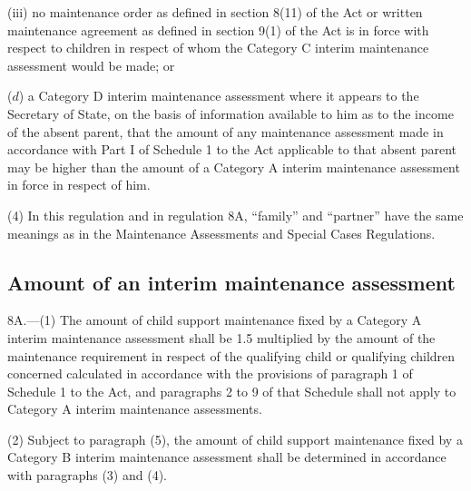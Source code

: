 \documentclass[a4paper,12pt]{article}
\begin{document}
\begin{enumerate}
\begin{enumerate}
(iii) no maintenance order as defined in section 8(11) of the Act or written maintenance agreement as defined in section 9(1) of the Act is in force with respect to children in respect of whom the Category C interim maintenance assessment would be made; or
\end{enumerate}

($d$) a Category D interim maintenance assessment where it appears to 
the Secretary of State,  %
on the basis of information available to him as to the income of the absent parent, that the amount of any maintenance assessment made in accordance with Part I of Schedule 1 to the Act applicable to that absent parent may be higher than the amount of a Category A interim maintenance assessment in force in respect of him.
\end{enumerate}

(4) In this regulation and in regulation 8A, “family” and “partner” have the same meanings as in the Maintenance Assessments and Special Cases Regulations.


\subsection[8A. Amount of an interim maintenance assessment]{Amount of an interim maintenance assessment}

8A.—(1) The amount of child support maintenance fixed by a Category A interim maintenance assessment shall be 1.5 multiplied by the amount of the maintenance requirement in respect of the qualifying child or qualifying children concerned calculated in accordance with the provisions of paragraph 1 of Schedule 1 to the Act, and paragraphs 2 to 9 of that Schedule shall not apply to Category A interim maintenance assessments.

(2) Subject to paragraph (5), the amount of child support maintenance fixed by a Category B interim maintenance assessment shall be determined in accordance with paragraphs (3) and (4).
\end{document}
